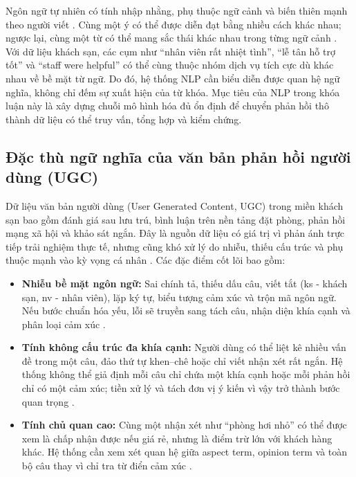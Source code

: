 Ngôn ngữ tự nhiên có tính nhập nhằng, phụ thuộc ngữ cảnh và biến thiên mạnh theo người viết \cite{manning1999foundations}. Cùng một ý có thể được diễn đạt bằng nhiều cách khác nhau; ngược lại, cùng một từ có thể mang sắc thái khác nhau trong từng ngữ cảnh \cite{jurafsky2000speech}. Với dữ liệu khách sạn, các cụm như ``nhân viên rất nhiệt tình'', ``lễ tân hỗ trợ tốt'' và ``staff were helpful'' có thể cùng thuộc nhóm dịch vụ tích cực dù khác nhau về bề mặt từ ngữ. Do đó, hệ thống NLP cần biểu diễn được quan hệ ngữ nghĩa, không chỉ đếm sự xuất hiện của từ khóa. Mục tiêu của NLP trong khóa luận này là xây dựng chuỗi mô hình hóa đủ ổn định để chuyển phản hồi thô thành dữ liệu có thể truy vấn, tổng hợp và kiểm chứng.

\subsection{Đặc thù ngữ nghĩa của văn bản phản hồi người dùng (UGC)}
\label{subsec:chap2-ugc}

Dữ liệu văn bản người dùng (User Generated Content, UGC) trong miền khách sạn bao gồm đánh giá sau lưu trú, bình luận trên nền tảng đặt phòng, phản hồi mạng xã hội và khảo sát ngắn. Đây là nguồn dữ liệu có giá trị vì phản ánh trực tiếp trải nghiệm thực tế, nhưng cũng khó xử lý do nhiễu, thiếu cấu trúc và phụ thuộc mạnh vào kỳ vọng cá nhân \cite{baccianella2010sentiwordnet}. Các đặc điểm cốt lõi bao gồm:

\begin{itemize}
    \item \textbf{Nhiễu bề mặt ngôn ngữ:} Sai chính tả, thiếu dấu câu, viết tắt (ks - khách sạn, nv - nhân viên), lặp ký tự, biểu tượng cảm xúc và trộn mã ngôn ngữ. Nếu bước chuẩn hóa yếu, lỗi sẽ truyền sang tách câu, nhận diện khía cạnh và phân loại cảm xúc \cite{liu2012sentiment}.
    \item \textbf{Tính không cấu trúc đa khía cạnh:} Người dùng có thể liệt kê nhiều vấn đề trong một câu, đảo thứ tự khen--chê hoặc chỉ viết nhận xét rất ngắn. Hệ thống không thể giả định mỗi câu chỉ chứa một khía cạnh hoặc mỗi phản hồi chỉ có một cảm xúc; tiền xử lý và tách đơn vị ý kiến vì vậy trở thành bước quan trọng \cite{hu2004mining}.
    \item \textbf{Tính chủ quan cao:} Cùng một nhận xét như ``phòng hơi nhỏ'' có thể được xem là chấp nhận được nếu giá rẻ, nhưng là điểm trừ lớn với khách hàng khác. Hệ thống cần xem xét quan hệ giữa aspect term, opinion term và toàn bộ câu thay vì chỉ tra từ điển cảm xúc \cite{liu2012sentiment}.
\end{itemize}

